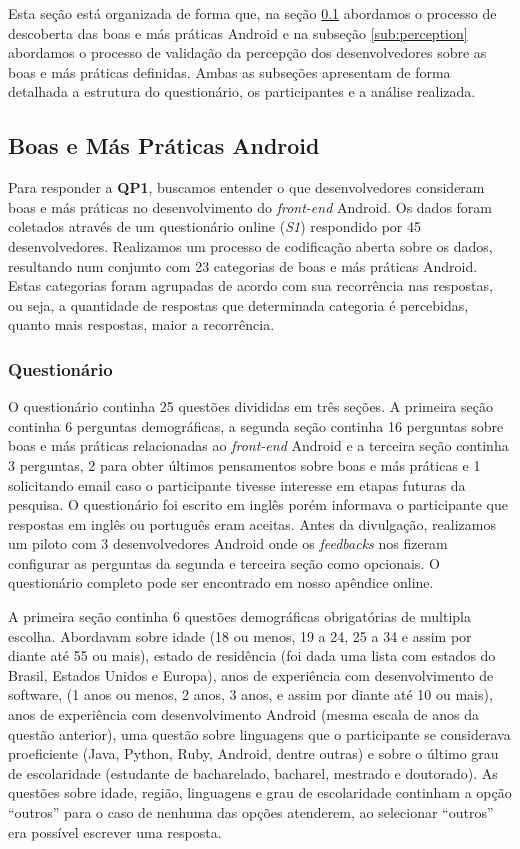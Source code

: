 Esta seção está organizada de forma que, na seção \ref{sub:smells} abordamos o processo de descoberta das boas e más práticas Android e na subseção \ref{sub:perception} abordamos o processo de validação da percepção dos desenvolvedores sobre as boas e más práticas definidas. Ambas as subseções apresentam de forma detalhada a estrutura do questionário, os participantes e a análise realizada. 

\subsection{Boas e Más Práticas Android}
\label{sub:smells}

Para responder a \textbf{QP1}, buscamos entender o que desenvolvedores consideram boas e más práticas no desenvolvimento do \textit{front-end} Android. Os dados foram coletados através de um questionário online (\textit{S1}) respondido por 45 desenvolvedores. Realizamos um processo de codificação aberta sobre os dados, resultando num conjunto com 23 categorias de boas e más práticas Android. Estas categorias foram agrupadas de acordo com sua recorrência nas respostas, ou seja, a quantidade de respostas que determinada categoria é percebidas, quanto mais respostas, maior a recorrência.

\subsubsection{Questionário}
\label{sub:smells-survey}

O questionário continha 25 questões divididas em três seções. A primeira seção continha 6 perguntas demográficas, a segunda seção continha 16 perguntas sobre boas e más práticas relacionadas ao \textit{front-end} Android e a terceira seção continha 3 perguntas, 2 para obter últimos pensamentos sobre boas e más práticas e 1 solicitando email caso o participante tivesse interesse em etapas futuras da pesquisa. O questionário foi escrito em inglês porém informava o participante que respostas em inglês ou português eram aceitas. Antes da divulgação, realizamos um piloto com 3 desenvolvedores Android onde os \textit{feedbacks} nos fizeram configurar as perguntas da segunda e terceira seção como opcionais. O questionário completo pode ser encontrado em nosso apêndice online.

A primeira seção continha 6 questões demográficas obrigatórias de multipla escolha. Abordavam sobre idade (18 ou menos, 19 a 24, 25 a 34 e assim por diante até 55 ou mais), estado de residência (foi dada uma lista com estados do Brasil, Estados Unidos e Europa), anos de experiência com desenvolvimento de software, (1 anos ou menos, 2 anos, 3 anos, e assim por diante até 10 ou mais), anos de experiência com desenvolvimento Android (mesma escala de anos da questão anterior), uma questão sobre linguagens que o participante se considerava proeficiente (Java, Python, Ruby, Android, dentre outras) e sobre o último grau de escolaridade (estudante de bacharelado, bacharel, mestrado e doutorado). As questões sobre idade, região, linguagens e grau de escolaridade continham a opção ``outros'' para o caso de nenhuma das opções atenderem, ao selecionar ``outros'' era possível escrever uma resposta.

